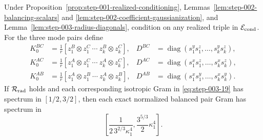 \begin{proposition}
\label{prop:step-003-elliptic-transfer}
Under Proposition~\ref{prop:step-001-realized-conditioning},
Lemmas~\ref{lem:step-002-balancing-scalars} and
\ref{lem:step-002-coefficient-gaussianization}, and
Lemma~\ref{lem:step-003-radius-diagonals}, condition on any realized triple
in \(\mathcal E_{\rm cond}\). For the three mode pairs define
\begin{equation}
  \begin{aligned}
  K_0^{BC}&=\frac1r[z_1^B\otimes z_1^C\ \cdots\ z_k^B\otimes z_k^C],
  &D^{BC}&=\operatorname{diag}(s_1^ys_1^z,\ldots,s_k^ys_k^z),\\
  K_0^{AC}&=\frac1r[z_1^A\otimes z_1^C\ \cdots\ z_k^A\otimes z_k^C],
  &D^{AC}&=\operatorname{diag}(s_1^xs_1^z,\ldots,s_k^xs_k^z),\\
  K_0^{AB}&=\frac1r[z_1^A\otimes z_1^B\ \cdots\ z_k^A\otimes z_k^B],
  &D^{AB}&=\operatorname{diag}(s_1^xs_1^y,\ldots,s_k^xs_k^y).
  \end{aligned}                                             \label{eq:step-003-19}
\end{equation}
If \(\mathcal R_{\rm rad}\) holds and each corresponding isotropic Gram in
\eqref{eq:step-003-19} has spectrum in \([1/2,3/2]\), then each exact normalized balanced pair
Gram has spectrum in
\begin{equation}
  \left[
    \frac1{2\,3^{2/3}\kappa_1^4},
    \frac{3^{5/3}}2\kappa_1^4
  \right].                                                  \label{eq:step-003-20}
\end{equation}

\end{proposition}

